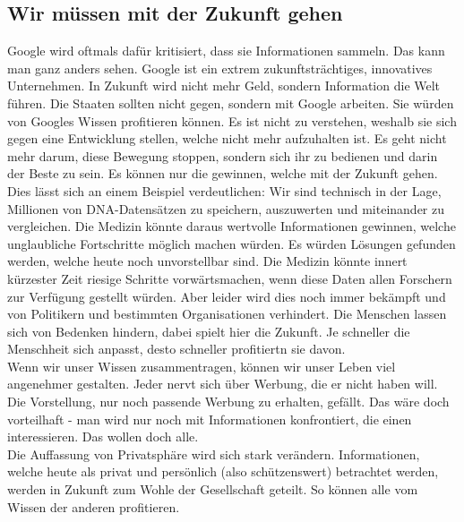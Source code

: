 \subsection{Wir müssen mit der Zukunft gehen}
Google wird oftmals dafür kritisiert, dass sie Informationen sammeln. 
Das kann man ganz anders sehen. Google ist ein extrem zukunftsträchtiges, 
innovatives Unternehmen. In Zukunft wird nicht mehr Geld, sondern 
Information die Welt führen. Die Staaten sollten nicht gegen, sondern 
mit Google arbeiten. Sie würden von Googles Wissen profitieren können.
Es ist nicht zu verstehen, weshalb sie sich gegen eine Entwicklung stellen, welche 
nicht mehr aufzuhalten ist. Es geht nicht mehr darum, diese Bewegung 
stoppen, sondern sich ihr zu bedienen und darin der Beste zu sein. Es 
können nur die gewinnen, welche mit der Zukunft gehen.\\
Dies l\"asst sich an einem Beispiel verdeutlichen: Wir sind technisch in 
der Lage, Millionen von DNA-Datensätzen zu speichern, auszuwerten und 
miteinander zu vergleichen. Die Medizin könnte daraus wertvolle 
Informationen gewinnen, welche unglaubliche Fortschritte möglich machen 
würden. Es würden Lösungen gefunden werden, welche heute noch unvorstellbar 
sind. Die Medizin könnte innert kürzester Zeit riesige Schritte 
vorwärtsmachen, wenn diese Daten allen Forschern zur Verfügung gestellt 
würden. Aber leider wird dies noch immer bekämpft und von Politikern 
und bestimmten Organisationen verhindert. Die Menschen lassen sich von Bedenken 
hindern, dabei spielt hier die Zukunft. Je schneller die Menschheit sich anpasst, 
desto schneller profitiertn sie davon.\\
Wenn wir unser Wissen zusammentragen, können wir unser Leben viel 
angenehmer gestalten. Jeder nervt sich über Werbung, die er nicht haben 
will. Die Vorstellung, nur noch passende 
Werbung zu erhalten, gef\"allt. Das wäre doch vorteilhaft - man wird nur noch mit 
Informationen konfrontiert, die einen interessieren. Das wollen doch 
alle.\\
Die Auffassung von Privatsphäre wird sich stark 
verändern. Informationen, welche heute als privat und persönlich 
(also schützenswert) betrachtet werden, werden in Zukunft zum Wohle der 
Gesellschaft geteilt. So können alle vom Wissen der anderen profitieren.

